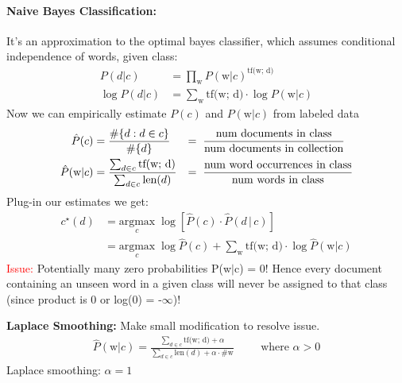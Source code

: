 \documentclass[a4paper,11pt]{article}
\newcommand{\tf}{\text{tf(w; d)}} %
\newcommand{\w}{\text{w}}
\begin{document}
\begin{multicols}{2}
\paragraph{Naive Bayes Classification:}
It's an approximation to the optimal bayes classifier, which assumes conditional independence of words, given class:
\begin{align*}
  P(d | c) &= \prod_{\w} P(\w | c)^{\tf} \\
  \log P(d | c) &= \sum_{\w} \tf \cdot \log P(\w | c)
\end{align*}
Now we can empirically estimate $P(c)$ and $P(\w | c)$ from labeled data
\begin{align*}
  \hat{P}(c) &= \frac{\# \{d : d \in c \}}{\# \{ d \}} &=& \hspace{0.2cm} \frac{\text{num documents in class}}{\text{num documents in collection}}\\
  \hat{P}(\w | c) &= \frac{\sum_{d \in c} \tf}{\sum_{d \in c} \text{len}(d)} &=& \hspace{0.2cm}  \frac{\text{num word occurrences in class}}{\text{num words in class}} \\
\end{align*}
Plug-in our estimates we get:
\begin{align*}
  c^{\star}(d) &= \underset{c}{\text{argmax}} \; \log \left[ \hat{P}(c) \cdot  \hat{P}(d \, | \, c) \right] \\
               &= \underset{c}{\text{argmax}} \; \log \hat{P}(c) + \sum_{\w} \tf \cdot \log \hat{P}(\w | c)
\end{align*}
\textcolor{red}{Issue:} Potentially many zero probabilities P(w$|$c) = 0! Hence every document containing an unseen word in a given class will never be assigned to that class (since product is 0 or log(0) = -$\infty$)!

\textbf{Laplace Smoothing:} Make small modification to resolve issue.
\begin{align*}
  \hat{P}(\w | c) = \frac{\sum_{d \in c} \tf + \alpha}{\sum_{d \in c} \text{len}(d) + \alpha \cdot \# \w} \hspace{1cm} \text{where } \alpha > 0
\end{align*}
Laplace smoothing: $\alpha = 1$


\end{multicols}
\end{document}
